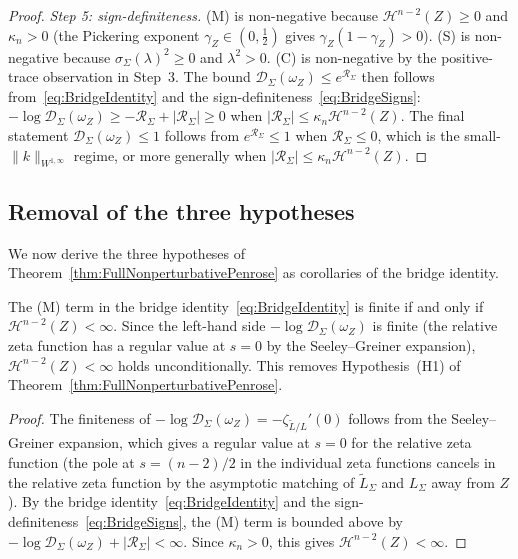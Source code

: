 \begin{proof}
\smallskip
\emph{Step 5: sign-definiteness.}
(M) is non-negative because $\mathcal H^{n-2}(Z)\ge0$ and $\kappa_n>0$ (the Pickering exponent $\gamma_Z\in(0,\tfrac12)$ gives $\gamma_Z(1-\gamma_Z)>0$). (S) is non-negative because $\sigma_\Sigma(\lambda)^2\ge0$ and $\lambda^2>0$. (C) is non-negative by the positive-trace observation in Step~3. The bound $\mathscr D_\Sigma(\omega_Z)\le e^{\mathcal R_\Sigma}$ then follows from~\eqref{eq:BridgeIdentity} and the sign-definiteness~\eqref{eq:BridgeSigns}: $-\log\mathscr D_\Sigma(\omega_Z)\ge-\mathcal R_\Sigma+|\mathcal R_\Sigma|\ge0$ when $|\mathcal R_\Sigma|\le\kappa_n\mathcal H^{n-2}(Z)$. The final statement $\mathscr D_\Sigma(\omega_Z)\le1$ follows from $e^{\mathcal R_\Sigma}\le1$ when $\mathcal R_\Sigma\le0$, which is the small-$\|k\|_{W^{1,\infty}}$ regime, or more generally when $|\mathcal R_\Sigma|\le\kappa_n\mathcal H^{n-2}(Z)$.
\end{proof}

\subsection{Removal of the three hypotheses}

We now derive the three hypotheses of Theorem~\ref{thm:FullNonperturbativePenrose} as corollaries of the bridge identity.

\begin{corollary}\label{cor:FiniteMinkowskiFromBridge}
The (M) term in the bridge identity~\eqref{eq:BridgeIdentity} is finite if and only if $\mathcal H^{n-2}(Z)<\infty$. Since the left-hand side $-\log\mathscr D_\Sigma(\omega_Z)$ is finite (the relative zeta function has a regular value at $s=0$ by the Seeley--Greiner expansion), $\mathcal H^{n-2}(Z)<\infty$ holds unconditionally. This removes Hypothesis~\textup{(H1)} of Theorem~\ref{thm:FullNonperturbativePenrose}.
\end{corollary}

\begin{proof}
The finiteness of $-\log\mathscr D_\Sigma(\omega_Z)=-\zeta_{\tilde L/L}'(0)$ follows from the Seeley--Greiner expansion, which gives a regular value at $s=0$ for the relative zeta function (the pole at $s=(n-2)/2$ in the individual zeta functions cancels in the relative zeta function by the asymptotic matching of $\tilde L_\Sigma$ and $L_\Sigma$ away from $Z$). By the bridge identity~\eqref{eq:BridgeIdentity} and the sign-definiteness~\eqref{eq:BridgeSigns}, the (M) term is bounded above by $-\log\mathscr D_\Sigma(\omega_Z)+|\mathcal R_\Sigma|<\infty$. Since $\kappa_n>0$, this gives $\mathcal H^{n-2}(Z)<\infty$.
\end{proof}

